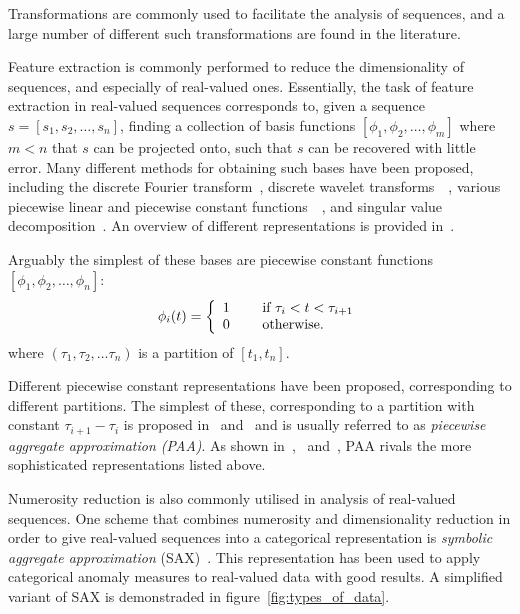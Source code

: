 Transformations are commonly used to facilitate the analysis of sequences, and a large number of different such transformations are found in the literature.

Feature extraction is commonly performed to reduce the dimensionality of sequences, and especially of real-valued ones. Essentially, the task of feature extraction in real-valued sequences corresponds to, given a sequence $s = [s_1, s_2, \dots, s_n]$, finding a collection of basis functions $[\phi_1, \phi_2, \dots, \phi_m]$ where $m < n$ that $s$ can be projected onto, such that $s$ can be recovered with little error. Many different methods for obtaining such bases have been proposed, including the discrete Fourier transform~\cite{faloutsos1}, discrete wavelet transforms~\cite{pong}~\cite{fu}, various piecewise linear and piecewise constant functions~\cite{keogh3}~\cite{geurts}, and singular value decomposition~\cite{keogh3}. An overview of different representations is provided in~\cite{fabian}.

Arguably the simplest of these bases are piecewise constant functions $[\phi_1, \phi_2, \dots, \phi_n]$:
\[
  \phi_i(t) = \left\{
    \begin{array}{l l}
      1 & \quad \text{ if } \tau_i < t < \tau_{i+1} \\
      0 & \quad \text{ otherwise.} \\
    \end{array} \right.
\]
where $(\tau_1, \tau_2, \dots \tau_n)$ is a partition of $[t_1, t_n]$.

Different piecewise constant representations have been proposed, corresponding to different partitions. The simplest of these, corresponding to a partition with constant $\tau_{i+1} - \tau_i$ is proposed in~\cite{keogh4} and~\cite{faloutsos2} and is usually referred to as \emph{piecewise aggregate approximation (PAA)}. As shown in~\cite{keogh5},~\cite{keogh3} and~\cite{faloutsos2}, PAA rivals the more sophisticated representations listed above.

Numerosity reduction is also commonly utilised in analysis of real-valued sequences. One scheme that combines numerosity and dimensionality reduction in order to give real-valued sequences into a categorical representation is \emph{symbolic aggregate approximation} (SAX)~\cite{sax}. This representation has been used to apply categorical anomaly measures to real-valued data with good results. A simplified variant of SAX is demonstraded in figure~\ref{fig:types_of_data}.

